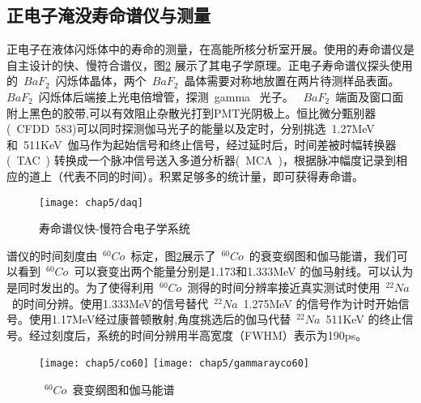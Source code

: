 \subsection{正电子淹没寿命谱仪与测量}
正电子在液体闪烁体中的寿命的测量，在高能所核分析室开展。使用的寿命谱仪是自主设计的快、慢符合谱仪，图\ref{fig:p54} 展示了其电子学原理。正电子寿命谱仪探头使用的~$BaF_{2}$~闪烁体晶体，两个~$BaF_{2}$~晶体需要对称地放置在两片待测样品表面。~$BaF_{2}$~闪烁体后端接上光电倍增管，探测~gamma~ 光子。%
~$BaF_{2}$~端面及窗口面附上黑色的胶带,可以有效阻止杂散光打到PMT光阴极上。恒比微分甄别器(~CFDD~583)可以同时探测伽马光子的能量以及定时，分别挑选~1.27MeV~ 和~511KeV~伽马作为起始信号和终止信号，经过延时后，时间差被时幅转换器(~TAC~) 转换成一个脉冲信号送入多道分析器(~MCA~)，根据脉冲幅度记录到相应的道上（代表不同的时间）。积累足够多的统计量，即可获得寿命谱。
\begin{figure}[!htbp]
  \centering
  \texttt{[image: chap5/daq]}
  \caption{寿命谱仪快-慢符合电子学系统}
  \label{fig:p54}
\end{figure}
谱仪的时间刻度由~$^{60}Co$~标定，图\ref{fig:p54}展示了~$^{60}Co$~的衰变纲图和伽马能谱，我们可以看到~$^{60}Co$~可以衰变出两个能量分别是1.173和1.333MeV 的伽马射线。可以认为是同时发出的。为了使得利用~$^{60}Co$~测得的时间分辨率接近真实测试时使用~$^{22}Na$~的时间分辨。使用1.333MeV的信号替代~$^{22}Na$~1.275MeV 的信号作为计时开始信号。使用1.17MeV经过康普顿散射,角度挑选后的伽马代替~$^{22}Na$~511KeV 的终止信号。经过刻度后，系统的时间分辨用半高宽度（FWHM）表示为190ps。
\begin{figure}[!htbp]
  \centering
   \texttt{[image: chap5/co60]}
  \texttt{[image: chap5/gammarayco60]}

  \caption{~$^{60}Co$~衰变纲图和伽马能谱}
  \label{fig:p54}
\end{figure}

